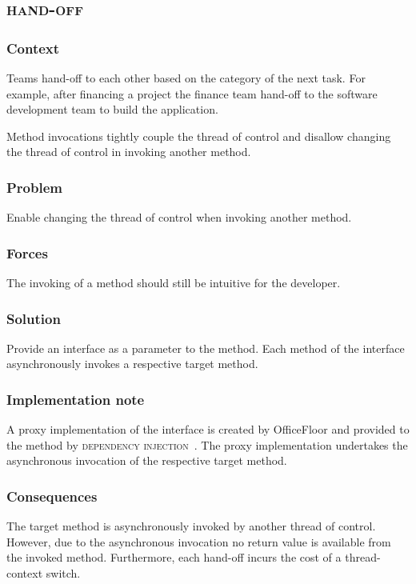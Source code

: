 \documentclass[prodmode]{style/acmlarge}
\begin{document}
\subsection{\textsc{\textbf{hand-off}}}

\subsubsection*{Context} Teams hand-off to each other based on the category of
the next task.  For example, after financing a project the finance team hand-off
to the software development team to build the application.

Method invocations tightly couple the thread of control and disallow changing
the thread of control in invoking another method.

\subsubsection*{Problem} Enable changing the thread of control when invoking
another method.

\subsubsection*{Forces} The invoking of a method should still be intuitive for
the developer.

\subsubsection*{Solution}  Provide an interface as a parameter to the method.
Each method of the interface asynchronously invokes a respective target method.

\subsubsection*{Implementation note} A proxy implementation of the interface is
created by OfficeFloor and provided to the method by \textsc{dependency
injection}~\cite{ioc}.  The proxy implementation undertakes the asynchronous
invocation of the respective target method.

\subsubsection*{Consequences} The target method is asynchronously invoked by
another thread of control.  However, due to the asynchronous invocation no
return value is available from the invoked method.  Furthermore, each hand-off
incurs the cost of a thread-context switch.
\end{document}
